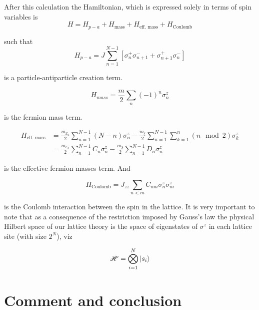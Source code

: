 After this calculation the Hamiltonian, which is expressed solely in terms of spin variables is
\begin{equation}
H = H_{p-a} + H_{\text{mass}} + H_{\text{eff. mass}} + H_{\text{Coulomb}}
\end{equation}

such that
\begin{equation*}
	H_{p-a}  = J \sum_{n=1}^{N-1}[\sigma^+_n \sigma^-_{n+1}  + \sigma^+_{n+1}\sigma^-_{n}  ]
\end{equation*}

is a particle-antiparticle creation term.

\begin{equation*}
	H_{mass}  = \frac{m}{2}\sum_n (-1)^n\sigma^z_n
\end{equation*}

is the fermion mass term.

\begin{align*}
	H_{\text{eff. mass}} &=  \frac{m_{\mathcal{E}_0}}{2} \sum_{n=1}^{N-1}(N-n)\sigma^z_n  - \frac{m_\xi}{2} \sum_{n=1}^{N-1}\sum_{k=1}^{n}(n\mod2)\sigma^z_{k}\\
	&= \frac{m_{\mathcal{E}_0}}{2}\sum_{n=1}^{N-1}C_n\sigma^z_n - \frac{m_\xi}{2} \sum_{n=1}^{N-1} D_n \sigma^z_n
\end{align*}

is the effective fermion masses term. And

\begin{equation*}
	H_{\text{Coulomb}} = J_{zz} \sum_{n<m}C_{nm}\sigma^z_n\sigma^z_m
\end{equation*}

is the Coulomb interaction between the spin in the lattice. It is very important to note that as a consequence of the  restriction imposed by Gauss's law the physical Hilbert space of our lattice theory is the space of eigenstates of $\sigma^z$ in each lattice site (with size $2^N$), viz

\begin{equation}
\mathscr{H} =\bigotimes_{i=1}^N\ket{s_i}
\end{equation}

\section{Comment and conclusion}

